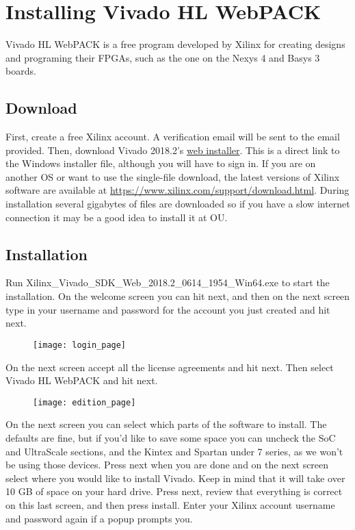\section{Installing Vivado HL WebPACK}
Vivado HL WebPACK is a free program developed by Xilinx for creating designs and programing their
FPGAs, such as the one on the Nexys 4 and Basys 3 boards.

\subsection{Download}
First, create a free Xilinx account.
A verification email will be sent to the email provided.
Then, download Vivado 2018.2's
\href{https://www.xilinx.com/member/forms/download/xef.html?filename=Xilinx_Vivado_SDK_Web_2018.2_0614_1954_Win64.exe}
{web installer}.
This is a direct link to the Windows installer file, although you will have to sign in.
If you are on another OS or want to use the single-file download, the latest versions of Xilinx
software are available at \url{https://www.xilinx.com/support/download.html}.
During installation several gigabytes of files are downloaded so if you have a slow internet
connection it may be a good idea to install it at OU.

\subsection{Installation}
Run Xilinx\_Vivado\_SDK\_Web\_2018.2\_0614\_1954\_Win64.exe to start the installation.
On the welcome screen you can hit next, and then on the next screen type in your username and
password for the account you just created and hit next.

\begin{figure}[!h]
    \texttt{[image: login\_page]}
\end{figure}

On the next screen accept all the license agreements and hit next.
Then select Vivado HL WebPACK and hit next.

\begin{figure}[!h]
    \texttt{[image: edition\_page]}
\end{figure}

On the next screen you can select which parts of the software to install.
The defaults are fine, but if you’d like to save some space you can uncheck the SoC and UltraScale
sections, and the Kintex and Spartan under 7 series, as we won’t be using those devices.
Press next when you are done and on the next screen select where you would like to install Vivado.
Keep in mind that it will take over 10 GB of space on your hard drive.
Press next, review that everything is correct on this last screen, and then press install.
Enter your Xilinx account username and password again if a popup prompts you.


